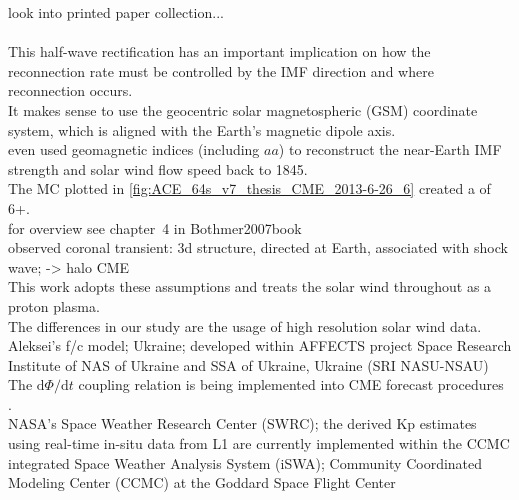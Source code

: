 look into printed paper collection...\\

\citep[p.~103]{Russell2007}\\
This half-wave rectification has an important implication on how the reconnection rate must be controlled by the IMF direction and where reconnection occurs.\\

It makes sense to use the geocentric solar magnetospheric (GSM) coordinate system, which is aligned with the Earth's magnetic dipole axis.\\

\citet{Lockwood2014} even used geomagnetic indices (including $aa$) to reconstruct the near-Earth IMF strength and solar wind flow speed back to 1845.\\

The MC plotted in \autoref{fig:ACE_64s_v7_thesis_CME_2013-6-26_6} created a \Kp{} of 6+.\\

for overview see chapter~4 in Bothmer2007book\\

observed coronal transient: 3d structure, directed at Earth, associated with shock wave; \citep{Howard1982} -> halo CME\\

This work adopts these assumptions and treats the solar wind throughout as a proton plasma.\\

The differences in our study are the usage of high resolution solar wind data.\\

Aleksei's f/c model; Ukraine; developed within AFFECTS project Space Research Institute of NAS of Ukraine and SSA of Ukraine, Ukraine (SRI NASU-NSAU)\\

The $\text{d}\Phi / \text{d}t$ coupling relation is being implemented into CME forecast procedures \citep{Savani2017}.\\
NASA's Space Weather Research Center (SWRC); the derived Kp estimates using real-time in-situ data from L1 are currently implemented within the CCMC integrated Space Weather Analysis System (iSWA); Community Coordinated Modeling Center (CCMC) at the Goddard Space Flight Center\\

